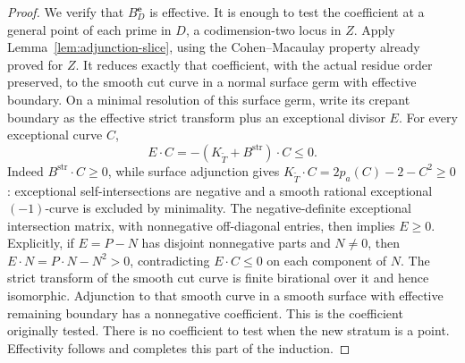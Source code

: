 \begin{proof}
We verify that \(B_D^{\mathbf e}\) is effective.  It is enough to test
the coefficient at a general point of each prime in \(D\), a codimension-two
locus in \(Z\).  Apply Lemma~\ref{lem:adjunction-slice}, using the
Cohen--Macaulay property already proved for \(Z\).  It reduces exactly
that coefficient, with the actual residue order preserved, to the smooth
cut curve in a normal surface germ with effective boundary.  On a minimal
resolution of this surface germ, write its
crepant boundary as the effective strict transform plus an exceptional
divisor \(E\).  For every exceptional curve \(C\),
\[
 E\cdot C=-(K_{\widetilde T}+B^{\mathrm{str}})\cdot C\leq0.
\]
Indeed \(B^{\mathrm{str}}\cdot C\geq0\), while surface adjunction gives
\(K_{\widetilde T}\cdot C=2p_a(C)-2-C^2\geq0\): exceptional
self-intersections are negative and a smooth rational exceptional
\((-1)\)-curve is excluded by minimality.  The negative-definite
exceptional intersection matrix, with nonnegative off-diagonal entries,
then implies \(E\geq0\).  Explicitly, if \(E=P-N\) has disjoint
nonnegative parts and \(N\ne0\), then
\(E\cdot N=P\cdot N-N^2>0\), contradicting \(E\cdot C\leq0\) on
each component of \(N\).  The strict
transform of the smooth cut curve is finite birational over it and hence
isomorphic.  Adjunction to that smooth curve in a smooth surface with
effective remaining boundary has a nonnegative coefficient.  This is
the coefficient originally tested.  There is no coefficient to test when
the new stratum is a point.  Effectivity follows and completes this part
of the induction.


\end{proof}
